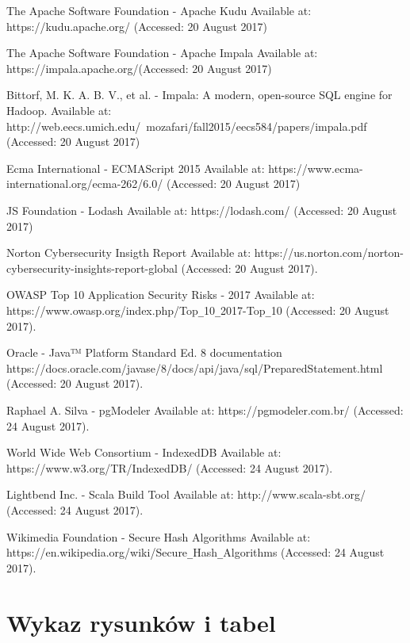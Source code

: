 \documentclass[a4paper,12pt,twoside]{article}
\begin{document}
\begin{thebibliography}{99}
The Apache Software Foundation - Apache Kudu Available at:
https://kudu.apache.org/ (Accessed: 20 August 2017)

The Apache Software Foundation - Apache Impala Available at:
https://impala.apache.org/(Accessed: 20 August 2017)

Bittorf, M. K. A. B. V., et al. - Impala: A modern, open-source SQL engine for Hadoop.
Available at: http://web.eecs.umich.edu/~mozafari/fall2015/eecs584/papers/impala.pdf (Accessed: 20 August 2017)

Ecma International - ECMAScript 2015
Available at: https://www.ecma-international.org/ecma-262/6.0/ (Accessed: 20 August 2017)

JS Foundation - Lodash
Available at: https://lodash.com/ (Accessed: 20 August 2017)

Norton Cybersecurity Insigth Report 
Available at: https://us.norton.com/norton-cybersecurity-insights-report-global (Accessed: 20 August 2017).

OWASP Top 10 Application Security Risks - 2017 Available at: 
https://www.owasp.org/index.php/Top\verb!_!10\verb!_!2017-Top\verb!_!10 (Accessed: 20 August 2017).

Oracle - Java™ Platform Standard Ed. 8 documentation
https://docs.oracle.com/javase/8/docs/api/java/sql/PreparedStatement.html (Accessed: 20 August 2017).

Raphael A. Silva - pgModeler Available at: https://pgmodeler.com.br/
(Accessed: 24 August 2017).

World Wide Web Consortium - IndexedDB Available at: https://www.w3.org/TR/IndexedDB/
(Accessed: 24 August 2017).

Lightbend Inc. - Scala Build Tool 
 Available at: http://www.scala-sbt.org/
(Accessed: 24 August 2017).

Wikimedia Foundation - Secure Hash Algorithms 
Available at: https://en.wikipedia.org/wiki/Secure\verb!_!Hash\verb!_!Algorithms
(Accessed: 24 August 2017).
\end{thebibliography}

\newpage
\section*{Wykaz rysunków i tabel}
\listoffigures
\listoftables
\end{document}
